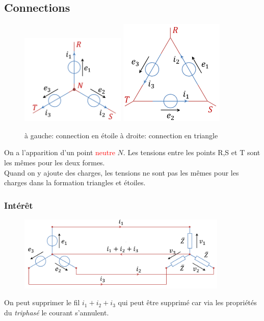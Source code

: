 \documentclass{report}
\begin{document}
\subsection{Connections}
\begin{figure}[H]
\centering
\includegraphics[width=5cm]{img/etoile.png}
\includegraphics[width=5cm]{img/triangle.png}
\caption{à gauche: connection en étoile à droite: connection en triangle}
\end{figure}
On a l'apparition d'un point \textcolor{red}{neutre} $N$. Les tensions entre les points R,S et T sont les mêmes pour les deux formes.\\

Quand on y ajoute des charges, les tensions ne sont pas les mêmes pour les charges dans la formation triangles et étoiles.

\subsubsection{Intérêt}
\begin{figure}[H]
\centering
\includegraphics[width=10cm]{img/utilite.png}
\end{figure}
On peut supprimer le fil $i_1 + i_2 + i_3$ qui peut être supprimé car via les propriétés du \textit{triphasé} le courant s'annulent.
\end{document}
